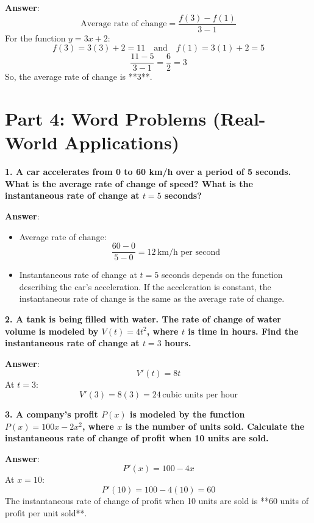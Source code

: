 \documentclass{article}
\begin{document}
\textbf{Answer}: 
\[
\text{Average rate of change} = \frac{f(3) - f(1)}{3 - 1}
\]
For the function \( y = 3x + 2 \):
\[
f(3) = 3(3) + 2 = 11 \quad \text{and} \quad f(1) = 3(1) + 2 = 5
\]
\[
\frac{11 - 5}{3 - 1} = \frac{6}{2} = 3
\]
So, the average rate of change is **3**.

\newpage

\section*{Part 4: Word Problems (Real-World Applications)}

\textbf{1. A car accelerates from 0 to 60 km/h over a period of 5 seconds. What is the average rate of change of speed? What is the instantaneous rate of change at \( t = 5 \) seconds?}

\textbf{Answer}: 
\begin{itemize}
    \item Average rate of change:
    \[
    \frac{60 - 0}{5 - 0} = 12 \, \text{km/h per second}
    \]
    \item Instantaneous rate of change at \( t = 5 \) seconds depends on the function describing the car's acceleration. If the acceleration is constant, the instantaneous rate of change is the same as the average rate of change.
\end{itemize}

\bigskip

\textbf{2. A tank is being filled with water. The rate of change of water volume is modeled by \( V(t) = 4t^2 \), where \( t \) is time in hours. Find the instantaneous rate of change at \( t = 3 \) hours.}

\textbf{Answer}: 
\[
V'(t) = 8t
\]
At \( t = 3 \):
\[
V'(3) = 8(3) = 24 \, \text{cubic units per hour}
\]

\bigskip

\textbf{3. A company’s profit \( P(x) \) is modeled by the function \( P(x) = 100x - 2x^2 \), where \( x \) is the number of units sold. Calculate the instantaneous rate of change of profit when 10 units are sold.}

\textbf{Answer}: 
\[
P'(x) = 100 - 4x
\]
At \( x = 10 \):
\[
P'(10) = 100 - 4(10) = 60
\]
The instantaneous rate of change of profit when 10 units are sold is **60 units of profit per unit sold**.
\end{document}
